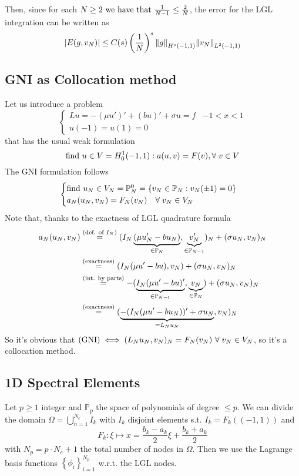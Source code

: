 Then, since for each \(N\geq 2 \text{ we have that }\frac{1}{N-1} \leq \frac{2}{N}\), the error for the LGL integration can be written as 
\[
    \abs{E(g,v_N)} \leq C(s)\left(\frac{1}{N}\right)^s \norm{g}_{H^s(-1,1)} \norm{v_N}_{L^2(-1,1)}
\]

\subsection{GNI as Collocation method}
Let us introduce a problem 
\[
    \begin{cases}
        Lu = -(\mu u')' + (bu)' + \sigma u =  f & -1 < x < 1 \\
        u(-1) = u(1) = 0
    \end{cases}
\]
that has the usual weak formulation 
\[
    \text{find } u \in V = H^1_0(-1,1): a(u,v) = F(v), \forall \; v \in V
\]
The GNI formulation follows 
\[
    \begin{cases}
        \text{find } u_N \in V_N = \mathbb{P}^0_N = \left\{v_N  \in \mathbb{P}_N : v_N(\pm 1) = 0\right\} \\
        a_N(u_N, v_N) = F_N(v_N) \quad \forall \; v_N \in V_N
    \end{cases}
\]
Note that, thanks to the exactness of LGL quadrature formula 
\begin{align*}
    a_N(u_N, v_N) &\overset{(\text{def. of }I_N)}{=} (I_N\underbrace{(\mu u'_N - bu_N)}_{\in \mathbb{P}_N}, \underbrace{v'_N}_{\in \mathbb{P}_{N-1}})_N + (\sigma u_N, v_N)_N \\
    &\overset{(\text{exactness})}{=} (I_N(\mu u' - b u), v_N) + (\sigma u_N, v_N)_N \\
    &\overset{(\text{int. by parts})}{=} -(\underbrace{I_N(\mu u' - b u)'}_{\in \mathbb{P}_{N-1}}, \underbrace{v_N}_{\in \mathbb{P}_N}) + (\sigma u_N, v_N)_N \\
    &\overset{(\text{exactness})}{=} (\underbrace{-(I_N(\mu u' - b u_N))' + \sigma u_N}_{= L_Nu_N}, v_N)_N
\end{align*}
So it's obvious that \((\txt{GNI}) \iff (L_Nu_N, v_N)_N = F_N(v_N) \ \forall \; v_N \in V_N\), so it's a collocation method.
\subsection{1D Spectral Elements}
Let \(p \geq 1\) integer and \(\mathbb{P}_p\) the space of polynomials of degree \(\leq p\). We can divide the domain \(\Omega = \bigcup_{n=1}^{N_e} I_k\) with \(I_k\) disjoint elements s.t. \(I_k = F_k ((-1,1))\) and 
\[
    F_k : \xi \mapsto x = \frac{b_k -a_k}{2}\xi + \frac{b_k+a_k}{2}
\]
with \(N_p = p\cdot N_e +1\) the total number of nodes in \(\Omega\). 
Then we use the Lagrange basis functions \(\left\{ \phi_i\right\}_{i=1}^{N_p}\) w.r.t. the LGL nodes.

